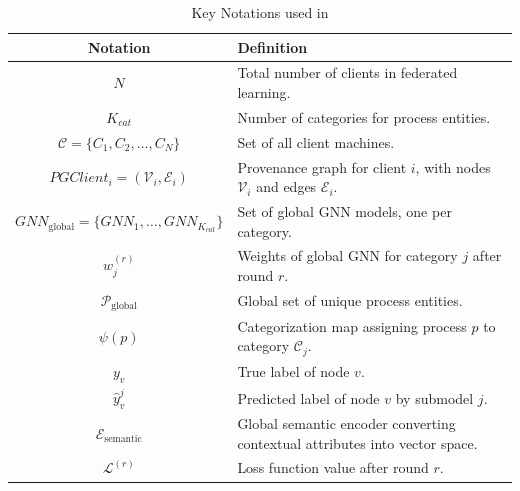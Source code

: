 \begin{table}[!t]
  \centering
  \scriptsize
  \caption{Key Notations used in \Sys}
  \label{tab:keynotations}
  \begin{tabular}{|c|p{4cm}|}
  \hline
  \textbf{Notation} & \textbf{Definition} \\ \hline
  \( N \) & Total number of clients in federated learning. \\ \hline
  \( K_{cat} \) & Number of categories for process entities. \\ \hline
  \( \mathcal{C} = \{C_1, C_2, \ldots, C_N\} \) & Set of all client machines. \\ \hline

  \( PGClient_{i} = (\mathcal{V}_i, \mathcal{E}_i) \) & Provenance graph for client \( i \), with nodes \( \mathcal{V}_i \) and edges \( \mathcal{E}_i \). \\ \hline
  \( {GNN}_{\text{global}} = \{GNN_1, \ldots, GNN_{K_{cat}}\} \) & Set of global GNN models, one per category. \\ \hline
  \( w_j^{(r)} \) & Weights of global GNN for category \( j \) after round \( r \). \\ \hline
  \( \mathcal{P}_{\text{global}} \) & Global set of unique process entities. \\ \hline
  \( \psi(p) \) & Categorization map assigning process \( p \) to category \( \mathcal{C}_j \). \\ \hline
  \( y_v \) & True label of node \( v \). \\ \hline
  \( \hat{y}_v^j \) & Predicted label of node \( v \) by submodel \( j \). \\ \hline
  \( \mathcal{E}_{\text{semantic}} \) & Global semantic encoder converting contextual attributes into vector space. \\ \hline
  \( \mathcal{L}^{(r)} \) & Loss function value after round \( r \). \\ \hline
  \end{tabular}
\end{table}




  

